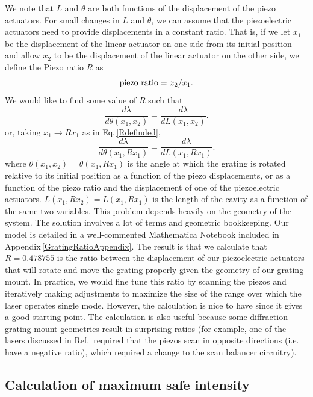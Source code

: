 We note that $L$ and $\theta$ are both functions of the displacement of the piezo actuators. For small changes in $L$ and $\theta$, we can assume that the piezoelectric actuators need to provide displacements in a constant ratio. That is, if we let $x_1$ be the displacement of the linear actuator on one side from its initial position and allow $x_2$ to be the displacement of the linear actuator on the other side, we define the Piezo ratio $R$ as 
\begin{equation}
\label{Rdefinded}
\textnormal{piezo ratio}=x_2/x_1.
\end{equation}
We would like to find some value of $R$ such that
\begin{equation}
    \frac{d\lambda}{d \theta(x_1,x_2)}= \frac{d \lambda}{d L(x_1,x_2)}.
\end{equation}
or, taking $x_1\rightarrow R x_1$ as in Eq.\,\eqref{Rdefinded},
\begin{equation}
    \frac{d\lambda}{d \theta(x_1,R x_1)}= \frac{d \lambda}{d L(x_1,R x_1)}.
\end{equation}
where $\theta(x_1,x_2)=\theta(x_1,R x_1)$ is the angle at which the grating is rotated relative to its initial position as a function of the piezo displacements, or as a function of the piezo ratio and the displacement of one of the piezoelectric actuators. $L(x_1,R x_2)=L(x_1,R x_1)$ is the length of the cavity as a function of the same two variables.
This problem depends heavily on the geometry of the system. The solution involves a lot of terms and geometric bookkeeping. Our model is detailed in a well-commented Mathematica Notebook included in Appendix\,\ref{GratingRatioAppendix}. The result is that we calculate that $R=0.478755$ is the ratio between the displacement of our piezoelectric actuators that will rotate and move the grating properly given the geometry of our grating mount. In practice, we would fine tune this ratio by scanning the piezos and iteratively making adjustments to maximize the size of the range over which the laser operates single mode. However, the calculation is nice to have since it gives a good starting point. The calculation is also useful because some diffraction grating mount geometries result in surprising ratios (for example, one of the lasers discussed in Ref.\,\cite{cjeDiss} required that the piezos scan in opposite directions (i.e. have a negative ratio), which required a change to the scan balancer circuitry).



\subsection{Calculation of maximum safe intensity}

